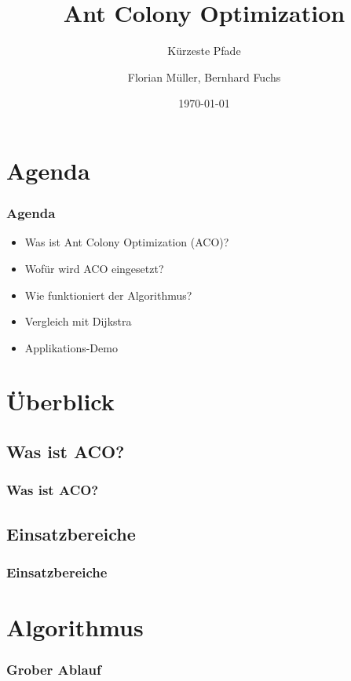 \documentclass[hyperref={pdfpagelabels=false}]{beamer}
\title{Ant Colony Optimization}
\subtitle{Kürzeste Pfade}
\author{Florian Müller, Bernhard Fuchs}
\date{\today}
\begin{document}

\begin{frame}
\titlepage
\end{frame} 

\section*{Agenda}

\begin{frame}
\frametitle{Agenda}
\begin{itemize}
\item Was ist Ant Colony Optimization (ACO)?
\item Wofür wird ACO eingesetzt?
\item Wie funktioniert der Algorithmus?
\item Vergleich mit Dijkstra
\item Applikations-Demo
\end{itemize}
\end{frame}

\section*{Überblick}

\subsection*{Was ist ACO?}

\begin{frame}
\frametitle{Was ist ACO?}
\end{frame}

\subsection*{Einsatzbereiche}

\begin{frame}
\frametitle{Einsatzbereiche}
\end{frame}

\section{Algorithmus}

\begin{frame}
\frametitle{Grober Ablauf}

\end{frame}
\end{document}
